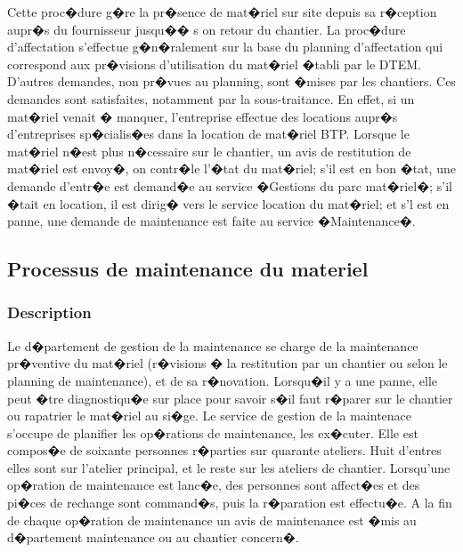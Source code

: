 \documentclass{article}
\begin{document}
				Cette proc�dure g�re la pr�sence de mat�riel sur site depuis sa r�ception aupr�s du fournisseur jusqu�� s on retour du chantier.
				\newline
				La proc�dure d'affectation s'effectue g�n�ralement sur la base du planning d'affectation qui correspond aux pr�visions d'utilisation du mat�riel �tabli par le DTEM. D'autres demandes, non pr�vues au planning, sont �mises par les chantiers. Ces demandes sont satisfaites, notamment par la sous-traitance. 
				\newline
				En effet, si un mat�riel venait � manquer, l'entreprise effectue des locations aupr�s d'entreprises sp�cialis�es dans la location de mat�riel BTP. Lorsque le mat�riel n�est plus n�cessaire sur le chantier, un avis de restitution de mat�riel est envoy�, on contr�le l'�tat du mat�riel; s'il est en bon �tat, une demande d'entr�e est demand�e au service �Gestions du parc mat�riel�; s'il �tait en location, il est dirig� vers le service location du mat�riel; et s'l est en panne, une demande de maintenance est faite au service �Maintenance�.


				
				
				
		\subsection{Processus de maintenance du materiel}
				\subsubsection{Description}
				
				Le d�partement de gestion de la maintenance se charge de la maintenance pr�ventive du mat�riel (r�visions � la restitution par un chantier ou selon le planning de maintenance), et de sa r�novation. Lorsqu�il y a une panne, elle peut �tre diagnostiqu�e sur place pour savoir s�il faut r�parer sur le chantier ou rapatrier le mat�riel au si�ge.
				\newline
				Le service de gestion de la maintenace s'occupe de planifier les op�rations de maintenance, les ex�cuter. Elle est compos�e de soixante personnes r�parties sur quarante ateliers. Huit d'entres elles sont sur l'atelier principal, et le reste sur les ateliers de chantier. Lorsqu'une op�ration de maintenance est lanc�e, des personnes sont affect�es et des pi�ces de rechange sont command�s, puis la r�paration est effectu�e. A la fin de chaque op�ration de maintenance un avis de maintenance est �mis au d�partement maintenance ou au chantier concern�.
				
\end{document}
